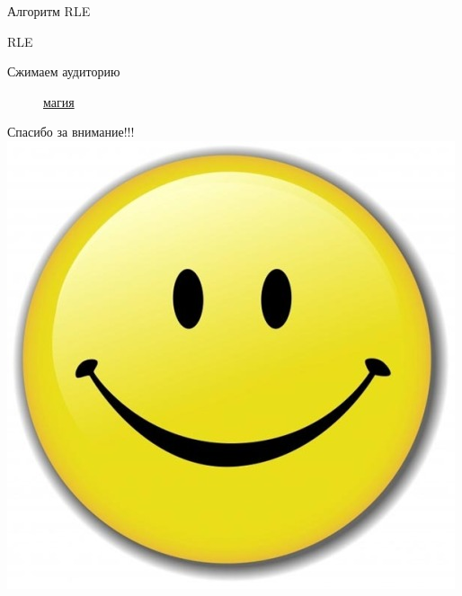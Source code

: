 \documentclass[11pt]{beamer}
\begin{document}
\begin{frame}{Алгоритм RLE}
\begin{block}{RLE}
\begin{figure}[H]
	\begin{center}
	\end{center}
\end{figure}	
\end{block}				
\end{frame}



\begin{frame}{Сжимаем аудиторию}
\begin{figure}[H]
	\begin{center}
		\huge\href{http://octo.ejiek.com/job/image_compression_algorithms/}{магия}
	\end{center}
\end{figure}					
\end{frame} 



\begin{frame}{}
\begin{center}
	\huge Спасибо за внимание!!!
	\includegraphics[scale=0.5]{../pics/smile.jpg}
\end{center}				
\end{frame}
\end{document}
